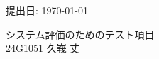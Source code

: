 \documentclass[a4j,11pt,dvipdfmx]{jsarticle}
\newcommand{\bhline}{\noalign{\hrule height 1pt}}
\begin{document}
提出日: \today
\begin{center}
\huge{システム評価のためのテスト項目}\\
\large{24G1051 久峩 丈}
\end{center}
\begin{flushright}
\end{flushright}


\end{document}
